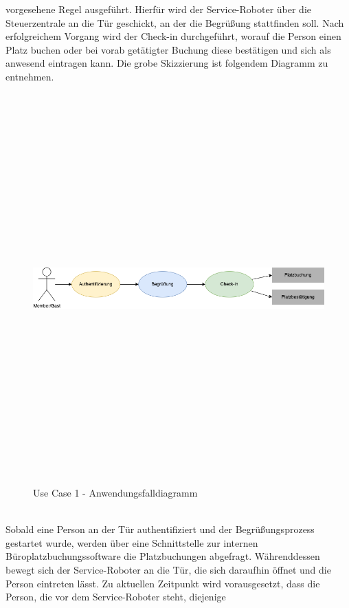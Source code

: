     vorgesehene Regel ausgeführt. Hierfür wird der Service-Roboter über die Steuerzentrale an die Tür geschickt, an der die Begrüßung 
    stattfinden soll. Nach erfolgreichem Vorgang wird der Check-in durchgeführt, worauf die Person einen Platz buchen oder bei vorab getätigter 
    Buchung diese bestätigen und sich als anwesend eintragen kann. Die grobe Skizzierung ist folgendem Diagramm zu entnehmen. 
    \begin{figure}[hbt!]
        \centering
        \includegraphics[width=15cm,height=15cm,keepaspectratio]{images/UC1_Diagramm_Check-in.png}
        \caption{Use Case 1 - Anwendungsfalldiagramm}
        \label{fig:uc1-check-in}
    \end{figure}
    \\
    \pagebreak
    \linebreak
    Sobald eine Person an der Tür authentifiziert und der Begrüßungsprozess gestartet wurde, werden über eine 
    Schnittstelle zur internen Büroplatzbuchungssoftware die Platzbuchungen abgefragt. Währenddessen bewegt sich der 
    Service-Roboter an die Tür, die sich daraufhin öffnet und die Person eintreten lässt. 
    Zu aktuellen Zeitpunkt wird vorausgesetzt, dass die Person, die vor dem Service-Roboter steht, diejenige 

